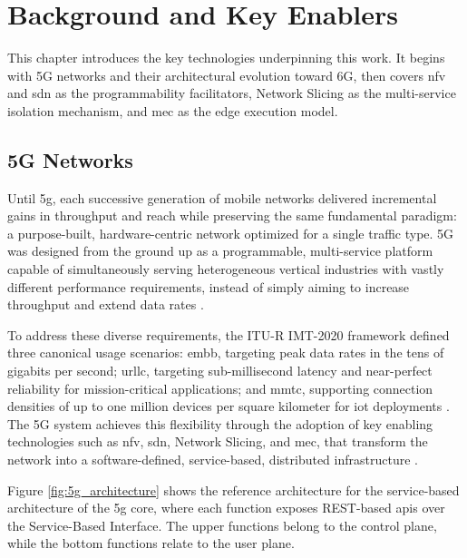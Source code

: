 \chapter{Background and Key Enablers}
\label{chap:background-key-enablers}

\begin{introduction}
This chapter introduces the key technologies underpinning this work. It begins with 5G networks and their architectural evolution toward 6G, then covers \ac{nfv} and \ac{sdn} as the programmability facilitators, Network Slicing as the multi-service isolation mechanism, and \ac{mec} as the edge execution model.
\end{introduction}


\section{5G Networks}

Until \ac{5g}, each successive generation of mobile networks delivered incremental gains in throughput and reach while preserving the same fundamental paradigm: a purpose-built, hardware-centric network optimized for a single traffic type. 5G was designed from the ground up as a programmable, multi-service platform capable of simultaneously serving heterogeneous vertical industries with vastly different performance requirements, instead of simply aiming to increase throughput and extend data rates \cite{ZieglerArchitecturevision5Gera2016}.

To address these diverse requirements, the ITU-R IMT-2020 framework defined three canonical usage scenarios: \ac{embb}, targeting peak data rates in the tens of gigabits per second; \ac{urllc}, targeting sub-millisecond latency and near-perfect reliability for mission-critical applications; and \ac{mmtc}, supporting connection densities of up to one million devices per square kilometer for \ac{iot} deployments \cite{IMTFrameworkoverallobjectivesfuturedevelopment2015}. The 5G system achieves this flexibility through the adoption of key enabling technologies such as \ac{nfv}, \ac{sdn}, Network Slicing, and \ac{mec}, that transform the network into a software-defined, service-based, distributed infrastructure \cite{HermosillaDeployment5GNetworkApplicationsMultidomain2022, antonyfranklin2020MultiaccessEdgeComputing}.

Figure \ref{fig:5g_architecture} shows the reference architecture for the service-based architecture of the \ac{5g} core, where each function exposes REST-based \acp{api} over the Service-Based Interface. The upper functions belong to the control plane, while the bottom functions relate to the user plane. 

